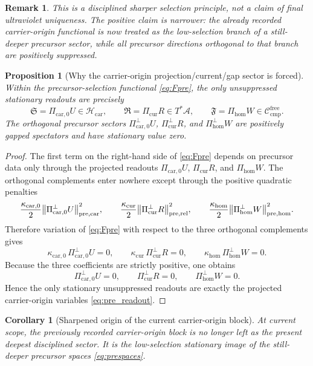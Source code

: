 \documentclass[11pt]{article}
\newcommand{\Sub}{\mathcal A}
\newcommand{\CompFree}{\mathscr C_{\mathrm{cmp}}^{\mathrm{free}}}
\newcommand{\CarrierClass}{\mathscr H_{\mathrm{car}}}
\newcommand{\CarrierSeed}{\mathfrak S}
\newcommand{\RelabelSeed}{\mathfrak R}
\newcommand{\FreeSeed}{\mathfrak F}
\newcommand{\PreTensor}{U}
\newcommand{\PreRelabel}{R}
\newcommand{\PreFree}{W}
\newcommand{\PreCarProj}{\Pi_{\mathrm{car},0}}
\newcommand{\PreCarPerp}{\Pi_{\mathrm{car},0}^{\perp}}
\newcommand{\CurrentProj}{\Pi_{\mathrm{cur}}}
\newcommand{\CurrentPerp}{\Pi_{\mathrm{cur}}^{\perp}}
\newcommand{\FreeReadProj}{\Pi_{\mathrm{hom}}}
\newcommand{\FreeReadPerp}{\Pi_{\mathrm{hom}}^{\perp}}
\newcommand{\PreCarGap}{\kappa_{\mathrm{car},0}}
\newcommand{\CurrentGap}{\kappa_{\mathrm{cur}}}
\newcommand{\HomGap}{\kappa_{\mathrm{hom}}}
\newtheorem{proposition}{Proposition}
\newtheorem{remark}{Remark}
\newtheorem{corollary}{Corollary}
\begin{document}
\begin{remark}
This is a disciplined sharper selection principle, not a claim of final ultraviolet uniqueness. The positive claim is narrower: the already recorded carrier-origin functional is now treated as the low-selection branch of a still-deeper precursor sector, while all precursor directions orthogonal to that branch are positively suppressed.
\end{remark}

\begin{proposition}[Why the carrier-origin projection/current/gap sector is forced]
\label{prop:forced}
Within the precursor-selection functional \eqref{eq:Fpre}, the only unsuppressed stationary readouts are precisely
\[
\CarrierSeed=\PreCarProj\PreTensor\in\CarrierClass,
\qquad
\RelabelSeed=\CurrentProj\PreRelabel\in T^*\Sub,
\qquad
\FreeSeed=\FreeReadProj\PreFree\in\CompFree.
\]
The orthogonal precursor sectors \(\PreCarPerp\PreTensor\), \(\CurrentPerp\PreRelabel\), and \(\FreeReadPerp\PreFree\) are positively gapped spectators and have stationary value zero.
\end{proposition}

\begin{proof}
The first term on the right-hand side of \eqref{eq:Fpre} depends on precursor data only through the projected readouts \(\PreCarProj\PreTensor\), \(\CurrentProj\PreRelabel\), and \(\FreeReadProj\PreFree\). The orthogonal complements enter nowhere except through the positive quadratic penalties
\[
\frac{\PreCarGap}{2}\norm{\PreCarPerp\PreTensor}_{\mathrm{pre,car}}^2,
\qquad
\frac{\CurrentGap}{2}\norm{\CurrentPerp\PreRelabel}_{\mathrm{pre,rel}}^2,
\qquad
\frac{\HomGap}{2}\norm{\FreeReadPerp\PreFree}_{\mathrm{pre,hom}}^2.
\]
Therefore variation of \eqref{eq:Fpre} with respect to the three orthogonal complements gives
\[
\PreCarGap\,\PreCarPerp\PreTensor=0,
\qquad
\CurrentGap\,\CurrentPerp\PreRelabel=0,
\qquad
\HomGap\,\FreeReadPerp\PreFree=0.
\]
Because the three coefficients are strictly positive, one obtains
\begin{equation}
\PreCarPerp\PreTensor=0,
\qquad
\CurrentPerp\PreRelabel=0,
\qquad
\FreeReadPerp\PreFree=0.
\label{eq:pre_perp_zero}
\end{equation}
Hence the only stationary unsuppressed readouts are exactly the projected carrier-origin variables \eqref{eq:pre_readout}.
\end{proof}

\begin{corollary}[Sharpened origin of the current carrier-origin block]
\label{cor:sharpened}
At current scope, the previously recorded carrier-origin block is no longer left as the present deepest disciplined sector. It is the low-selection stationary image of the still-deeper precursor spaces \eqref{eq:prespaces}.
\end{corollary}
\end{document}
